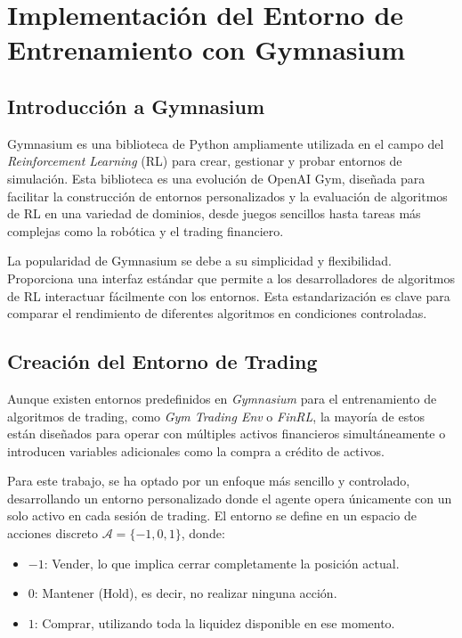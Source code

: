 \documentclass[a4paper,12pt, twoside]{report}
\begin{document}
\section{Implementación del Entorno de Entrenamiento con Gymnasium}

\subsection{Introducción a Gymnasium}

Gymnasium es una biblioteca de Python ampliamente utilizada en el campo del 
\textit{Reinforcement Learning} (RL) para crear, gestionar y probar entornos 
de simulación. Esta biblioteca es una evolución de OpenAI Gym, diseñada para 
facilitar la construcción de entornos personalizados y la evaluación de algoritmos 
de RL en una variedad de dominios, desde juegos sencillos hasta tareas más complejas 
como la robótica y el trading financiero.

La popularidad de Gymnasium se debe a su simplicidad y flexibilidad. Proporciona una 
interfaz estándar que permite a los desarrolladores de algoritmos de RL interactuar 
fácilmente con los entornos. Esta estandarización es clave para comparar el rendimiento 
de diferentes algoritmos en condiciones controladas.

\subsection{Creación del Entorno de Trading}

Aunque existen entornos predefinidos en \textit{Gymnasium} para el entrenamiento de 
algoritmos de trading, como \textit{Gym Trading Env} o \textit{FinRL}, la mayoría 
de estos están diseñados para operar con múltiples activos financieros simultáneamente 
o introducen variables adicionales como la compra a crédito de activos. 

Para este trabajo, se ha optado por un enfoque más sencillo y controlado, desarrollando 
un entorno personalizado donde el agente opera únicamente con un solo activo en cada 
sesión de trading. El entorno se define en un espacio de acciones discreto 
$\mathcal{A} = \{-1, 0, 1\}$, donde:

\begin{itemize}
    \item $-1$: Vender, lo que implica cerrar completamente la posición actual.
    \item $0$: Mantener (Hold), es decir, no realizar ninguna acción.
    \item $1$: Comprar, utilizando toda la liquidez disponible en ese momento.
\end{itemize}
\end{document}
